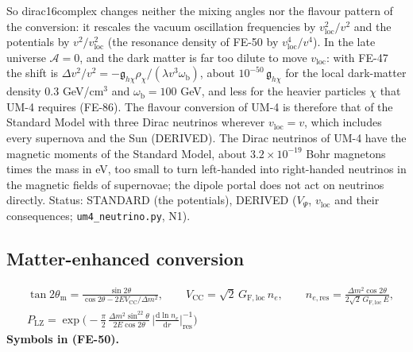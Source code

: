 \documentclass[
  10pt,
]{article}
\begin{document}
So dirac16complex changes neither the mixing angles nor the flavour
pattern of the conversion: it rescales the vacuum oscillation
frequencies by \(v_{\mathrm{loc}}^2/v^2\) and the potentials by
\(v^2/v_{\mathrm{loc}}^2\) (the resonance density of FE-50 by
\(v_{\mathrm{loc}}^4/v^4\)). In the late universe \(\mathcal{A} = 0\),
and the dark matter is far too dilute to move \(v_{\mathrm{loc}}\): with
FE-47 the shift is
\(\Delta v^2/v^2 = -\mathfrak{g}_{h\chi}\rho_\chi/(\lambda v^3\omega_{\mathrm{b}})\),
about \(10^{-50}\,\mathfrak{g}_{h\chi}\) for the local dark-matter
density \(0.3\) GeV/cm\(^3\) and \(\omega_{\mathrm{b}} = 100\) GeV, and
less for the heavier particles \(\chi\) that UM-4 requires (FE-86). The
flavour conversion of UM-4 is therefore that of the Standard Model with
three Dirac neutrinos wherever \(v_{\mathrm{loc}} = v\), which includes
every supernova and the Sun (DERIVED). The Dirac neutrinos of UM-4 have
the magnetic moments of the Standard Model, about \(3.2\times10^{-19}\)
Bohr magnetons times the mass in eV, too small to turn left-handed into
right-handed neutrinos in the magnetic fields of supernovae; the dipole
portal does not act on neutrinos directly. Status: STANDARD (the
potentials), DERIVED (\(V_\Psi\), \(v_{\mathrm{loc}}\) and their
consequences; \texttt{um4\_neutrino.py}, N1).

\hypertarget{matter-enhanced-conversion}{%
\subsection{Matter-enhanced
conversion}\label{matter-enhanced-conversion}}

\[
\begin{aligned}
&\tan2\theta_{\mathrm{m}} = \frac{\sin2\theta}{\cos2\theta - 2EV_{\mathrm{CC}}/\Delta m^2},\qquad
 V_{\mathrm{CC}} = \sqrt2\,G_{\mathrm{F,loc}}\,n_e,\qquad
 n_{e,\mathrm{res}} = \frac{\Delta m^2\cos2\theta}{2\sqrt2\,G_{\mathrm{F,loc}}\,E},\\
&P_{\mathrm{LZ}} = \exp\Big(-\frac{\pi}{2}\,\frac{\Delta m^2\sin^22\theta}{2E\cos2\theta}\,\Big\lvert\frac{\mathrm{d}\ln n_e}{\mathrm{d}r}\Big\rvert^{-1}_{\mathrm{res}}\Big)
\end{aligned} \tag{FE-50}
\] \textbf{Symbols in (FE-50).}
\end{document}
